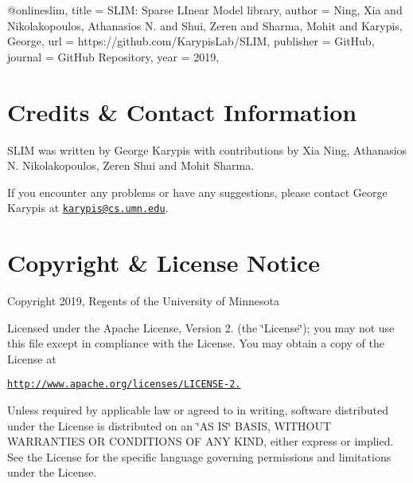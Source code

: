 \begin{DoxyVerb}@online{slim,
  title = {{SLIM}: Sparse LInear Model library},
  author = {Ning, Xia and Nikolakopoulos, Athanasios N. and Shui, Zeren and Sharma, Mohit and Karypis, George},
  url = {https://github.com/KarypisLab/SLIM},
  publisher = {GitHub},
  journal = {GitHub Repository},
  year = {2019},
}
\end{DoxyVerb}
\hypertarget{index_contact}{}\section{Credits \& Contact Information}\label{index_contact}
S\+L\+IM was written by George Karypis with contributions by Xia Ning, Athanasios N. Nikolakopoulos, Zeren Shui and Mohit Sharma.

If you encounter any problems or have any suggestions, please contact George Karypis at \href{mailto:karypis@cs.umn.edu}{\tt karypis@cs.\+umn.\+edu}.\hypertarget{index_license}{}\section{Copyright \& License Notice}\label{index_license}
Copyright 2019, Regents of the University of Minnesota

Licensed under the Apache License, Version 2. (the \char`\"{}\+License\char`\"{}); you may not use this file except in compliance with the License. You may obtain a copy of the License at

\href{http://www.apache.org/licenses/LICENSE-2.0}{\tt http\+://www.\+apache.\+org/licenses/\+L\+I\+C\+E\+N\+S\+E-\/2.}

Unless required by applicable law or agreed to in writing, software distributed under the License is distributed on an \char`\"{}\+A\+S I\+S\char`\"{} B\+A\+S\+IS, W\+I\+T\+H\+O\+UT W\+A\+R\+R\+A\+N\+T\+I\+ES OR C\+O\+N\+D\+I\+T\+I\+O\+NS OF A\+NY K\+I\+ND, either express or implied. See the License for the specific language governing permissions and limitations under the License. 